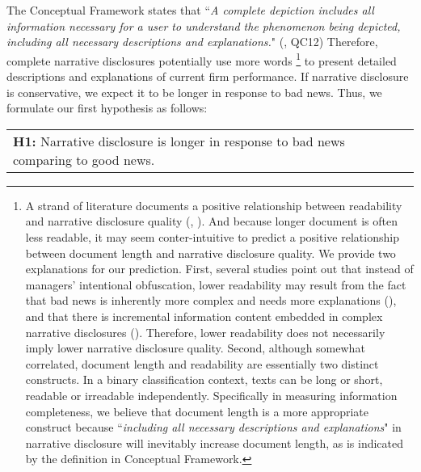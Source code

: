 \documentclass[a4paper]{article}
\begin{document}
\begin{spacing}{2}
The Conceptual Framework states that ``\textit{A complete depiction includes all information necessary for a user to understand the phenomenon being depicted, including all necessary descriptions and explanations.}" (\cite{fasbConceptualFrameworkFinancial2018}, QC12) Therefore, complete narrative disclosures potentially use more words \footnote{A strand of literature documents a positive relationship between readability and narrative disclosure quality (\cite{liAnnualReportReadability2008}, \cite{loEarningsManagementAnnual2017}). And because longer document is often less readable, it may seem conter-intuitive to predict a positive relationship between document length and narrative disclosure quality. We provide two explanations for our prediction. First, several studies point out that instead of managers' intentional obfuscation, lower readability may result from the fact that bad news is inherently more complex and needs more explanations (\cite{bloomfieldDiscussionAnnualReport2008}), and that there is incremental information content embedded in complex narrative disclosures (\cite{busheeLinguisticComplexityFirm2018}). Therefore, lower readability does not necessarily imply lower narrative disclosure quality. Second, although somewhat correlated, document length and readability are essentially two distinct constructs. In a binary classification context, texts can be long or short, readable or irreadable independently. Specifically in measuring information completeness, we believe that document length is a more appropriate construct because ``\textit{including all necessary descriptions and explanations}" in narrative disclosure will inevitably increase document length, as is indicated by the definition in Conceptual Framework.} to present detailed descriptions and explanations of current firm performance. If narrative disclosure is conservative, we expect it to be longer in response to bad news. Thus, we formulate our first hypothesis as follows:

\begin{center}
	\begin{tabular}{l}
		\textbf{H1:} Narrative disclosure is longer in response to bad news comparing to good news.
	\end{tabular}
\end{center}


\end{spacing}
\end{document}
